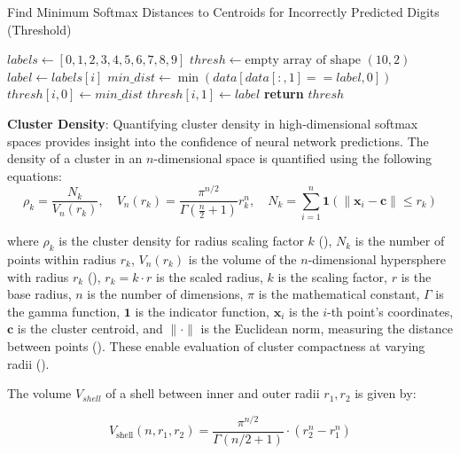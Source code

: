 \begin{algorithm}
\caption{Find Minimum Softmax Distances to Centroids for Incorrectly Predicted Digits (Threshold)}
\label{alg:min_distance} 
\begin{algorithmic}[1]
    \State $labels \gets [0, 1, 2, 3, 4, 5, 6, 7, 8, 9]$
    \State $thresh \gets \text{empty array of shape } (10, 2)$
        \State $label \gets labels[i]$
        \State $min\_dist \gets \min(data[data[:, 1] == label, 0])$
        \State $thresh[i, 0] \gets min\_dist$
        \State $thresh[i, 1] \gets label$
    \EndFor
    \State \textbf{return} $thresh$
\EndProcedure
\end{algorithmic}
\end{algorithm}

\textbf{Cluster Density}: Quantifying cluster density in high-dimensional softmax spaces provides insight into the confidence of neural network predictions. The density of a cluster in an $n$-dimensional space is quantified using the following equations:
\begin{equation}
\rho_k = \frac{N_k}{V_n(r_k)}, \quad V_n(r_k) = \frac{\pi^{n/2}}{\Gamma\left(\frac{n}{2} + 1\right)} r_k^n, \quad N_k = \sum_{i=1}^n \mathbf{1}(\|\mathbf{x}_i - \mathbf{c}\| \leq r_k) \label{eq:density_volume_count}
\end{equation}

\noindent where \(\rho_k\) is the cluster density for radius scaling factor \(k\) (\cite{Ester1996}), \(N_k\) is the number of points within radius \(r_k\), \(V_n(r_k)\) is the volume of the \(n\)-dimensional hypersphere with radius \(r_k\) (\cite{Conway1998}), \(r_k = k \cdot r\) is the scaled radius, \(k\) is the scaling factor, \(r\) is the base radius, \(n\) is the number of dimensions, \(\pi\) is the mathematical constant, \(\Gamma\) is the gamma function, \(\mathbf{1}\) is the indicator function, \(\mathbf{x}_i\) is the \(i\)-th point’s coordinates, \(\mathbf{c}\) is the cluster centroid, and \(\|\cdot\|\) is the Euclidean norm, measuring the distance between points (\cite{Duda2000}). These enable evaluation of cluster compactness at varying radii (\cite{Hastie2009}).

The volume $V_{shell}$ of a shell between inner and outer radii $r_1, r_2$ is given by:

\begin{equation}
V_{\text{shell}}(n, r_1, r_2) = \frac{\pi^{n/2}}{\Gamma(n/2 + 1)} \cdot \left( r_2^n - r_1^n \right)
\end{equation}


